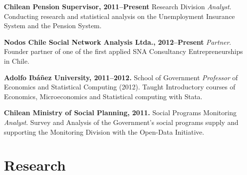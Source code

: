 \documentclass[letterpaper, 12pt]{article}
\renewenvironment{itemize}{
  \begin{list}{}{
    \setlength{\leftmargin}{0.45cm}
  }
}{
  \end{list}
}
\begin{document}
\begin{itemize}
\item \textbf{Chilean Pension Supervisor, 2011--Present} Research Division \emph{Analyst}.
Conducting research and statistical analysis on the Unemployment Insurance System and the Pension System.
\item \textbf{Nodos Chile Social Network Analysis Ltda., 2012--Present} \emph{Partner}.
Founder partner of one of the first applied SNA Consultancy Entrepreneurships in Chile.
\item \textbf{Adolfo Ib\'a\~nez University, 2011--2012.} School of Government \emph{Professor} of Economics and Statistical Computing (2012). 
Taught Introductory courses of Economics, Microeconomics and Statistical computing with Stata.
\item \textbf{Chilean Ministry of Social Planning, 2011.} Social Programs Monitoring \emph{Analyst}.
Survey and Analysis of the Government’s social programs supply and supporting the Monitoring Division with the Open-Data Initiative.
\end{itemize}

\section*{Research}
\end{document}
